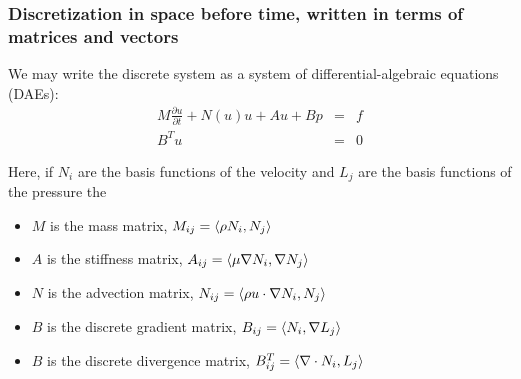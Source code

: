 \begin{frame}
\frametitle{Discretization in space before time, written in 
terms of matrices and vectors}

We may write the discrete system as a system of 
differential-algebraic equations (DAEs): 
\begin{eqnarray*}
M \frac{\partial u}{\partial t} +  N(u) u  +  A u +  B p &=& f  \\
B^T u &=& 0 
\end{eqnarray*}

  Here, if $N_i$ are the basis functions of the velocity  
  and $L_j$ are the basis functions of the pressure  the  
\begin{itemize}
\item $M$ is the mass matrix, $M_{ij} = \langle \rho N_i, N_j \rangle$ 
\item $A$ is the stiffness matrix, $A_{ij} = \langle \mu \nabla N_i, \nabla N_j \rangle$ 
\item $N$ is the advection matrix, $N_{ij} = \langle \rho u \cdot \nabla N_i, N_j \rangle$ 
\item $B$ is the discrete gradient matrix, $B_{ij} = \langle N_i, \nabla L_j \rangle$ 
\item $B$ is the discrete divergence matrix, $B^{T}_{ij} = \langle \nabla \cdot N_i, L_j \rangle$ 
\end{itemize}

\end{frame}

